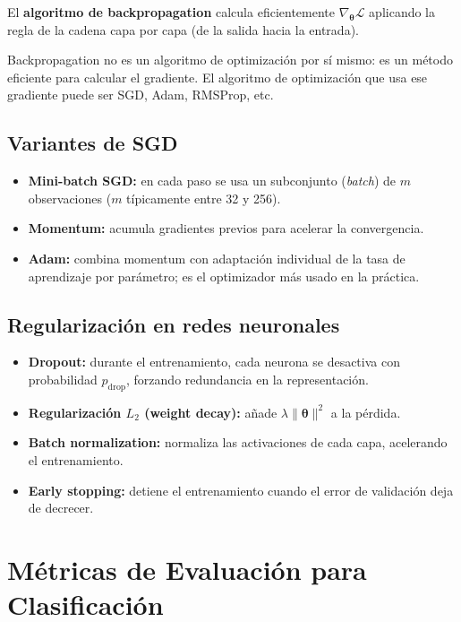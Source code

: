 \documentclass[12pt, a4paper]{article}
\theoremstyle{definition}
\theoremstyle{plain}
\theoremstyle{remark}
\begin{document}
El \textbf{algoritmo de backpropagation} calcula eficientemente $\nabla_{\bm{\theta}} \mathcal{L}$ aplicando la regla de la cadena capa por capa (de la salida hacia la entrada).

\begin{conceptoclave}
  Backpropagation no es un algoritmo de optimización por sí mismo: es un método eficiente para calcular el gradiente. El algoritmo de optimización que usa ese gradiente puede ser SGD, Adam, RMSProp, etc.
\end{conceptoclave}

\subsection{Variantes de SGD}

\begin{itemize}
  \item \textbf{Mini-batch SGD:} en cada paso se usa un subconjunto (\textit{batch}) de $m$ observaciones ($m$ típicamente entre 32 y 256).
  \item \textbf{Momentum:} acumula gradientes previos para acelerar la convergencia.
  \item \textbf{Adam:} combina momentum con adaptación individual de la tasa de aprendizaje por parámetro; es el optimizador más usado en la práctica.
\end{itemize}

\subsection{Regularización en redes neuronales}

\begin{itemize}
  \item \textbf{Dropout:} durante el entrenamiento, cada neurona se desactiva con probabilidad $p_{\text{drop}}$, forzando redundancia en la representación.
  \item \textbf{Regularización $L_2$ (weight decay):} añade $\lambda\|\bm{\theta}\|^2$ a la pérdida.
  \item \textbf{Batch normalization:} normaliza las activaciones de cada capa, acelerando el entrenamiento.
  \item \textbf{Early stopping:} detiene el entrenamiento cuando el error de validación deja de decrecer.
\end{itemize}

\section{Métricas de Evaluación para Clasificación}
\end{document}
